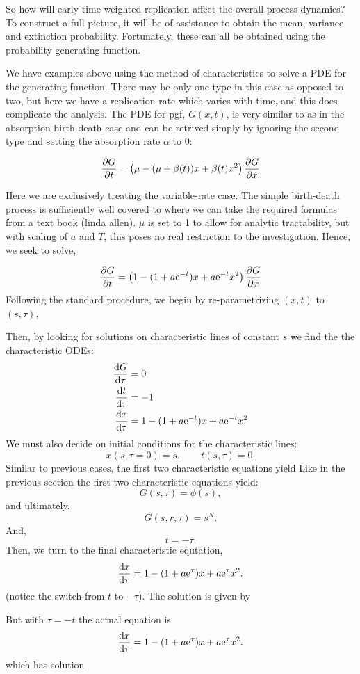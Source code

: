 So how will early-time weighted replication affect the overall process dynamics? To construct a full picture, it will be of assistance to obtain the mean, variance and extinction probability. Fortunately, these can all be obtained using the probability generating function.\par
We have examples above using the method of characteristics to solve a PDE for the generating function. There may be only one type in this case as opposed to two, but here we have a replication rate which varies with time, and this does complicate the analysis. The PDE for pgf, $G(x,t)$, is very similar to as in the absorption-birth-death case and can be retrived simply by ignoring the second type and setting the absorption rate $\alpha$ to 0:

 $$\displaystyle\frac{\partial G}{\partial t} = \left(\mu - (\mu+ \beta(t))x + \beta(t) x^2\right)\displaystyle\frac{\partial G}{\partial x}$$

Here we are exclusively treating the variable-rate case. The simple birth-death process is sufficiently well covered to where we can take the required formulas from a text book (linda allen). $\mu$ is set to 1 to allow for analytic tractability, but with scaling of $a$ and $T$, this poses no real restriction to the investigation. Hence, we seek to solve,

 $$\displaystyle\frac{\partial G}{\partial t} = \left(1 - (1+ a {\rm e}^{-t})x +  a {\rm e}^{-t}x^2\right)\displaystyle\frac{\partial G}{\partial x}$$
 Following the standard procedure, we begin by re-parametrizing $(x,t)$ to $(s,\tau)$,
 
 Then, by looking for solutions on characteristic lines of constant $s$ we find the the characteristic ODEs: 
\begin{align}
\displaystyle\frac{{\rm d} G}{{\rm d} \tau} &= 0\\
\displaystyle\frac{{\rm d} t}{{\rm d} \tau} &= -1\\
\displaystyle\frac{{\rm d} x}{{\rm d} \tau} &= 1-(1+a{\rm e}^{-t})x + a{\rm e}^{-t} x^2
\end{align}
We must also decide on initial conditions for the characteristic lines:
$$x(s, \tau = 0) = s, \qquad  t(s, \tau) = 0.$$
Similar to previous cases, the first two characteristic equations yield
Like in the previous section the first two characteristic equations yield: 
$$G(s,\tau) = \phi(s),$$
and ultimately,
\begin{equation}
G(s,r,\tau) = s^N.
\end{equation}
And,
$$t = -\tau.$$   
Then, we turn to the final characteristic equtation,
$$\displaystyle\frac{{\rm d} x}{{\rm d} \tau} = 1-(1+a{\rm e}^{\tau})x + a{\rm e}^{\tau} x^2.$$
(notice the switch from $t$ to $-\tau$). The solution is given by

But with $\tau = -t$ the actual equation is 
 $$\displaystyle\frac{{\rm d} x}{{\rm d} \tau} = 1-(1+a{\rm e}^{\tau})x + a{\rm e}^{\tau} x^2.$$
 which has solution

